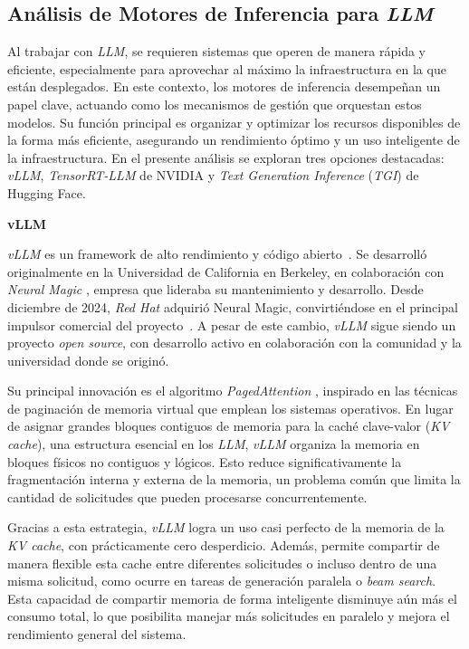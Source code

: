 \subsection{Análisis de Motores de Inferencia para \textit{LLM}}
Al trabajar con \textit{LLM}, se requieren sistemas que operen de manera rápida y eficiente, especialmente para aprovechar al máximo la infraestructura en la que están desplegados. En este contexto, los motores de inferencia desempeñan un papel clave, actuando como los mecanismos de gestión que orquestan estos modelos. Su función principal es organizar y optimizar los recursos disponibles de la forma más eficiente, asegurando un rendimiento óptimo y un uso inteligente de la infraestructura. En el presente análisis se exploran tres opciones destacadas: \textit{vLLM}, \textit{TensorRT-LLM} de NVIDIA y \textit{Text Generation Inference} (\textit{TGI}) de Hugging Face.

\vspace{0.5cm}
\noindent \textbf{vLLM}

\textit{vLLM} es un framework de alto rendimiento y código abierto~\cite{ref11}. Se desarrolló originalmente en la Universidad de California en Berkeley, en colaboración con \textit{Neural Magic} \cite{ref69}, empresa que lideraba su mantenimiento y desarrollo. Desde diciembre de 2024, \textit{Red Hat} adquirió Neural Magic, convirtiéndose en el principal impulsor comercial del proyecto~\cite{ref12}. A pesar de este cambio, \textit{vLLM} sigue siendo un proyecto \textit{open source}, con desarrollo activo en colaboración con la comunidad y la universidad donde se originó.

Su principal innovación es el algoritmo \textit{PagedAttention} \cite{ref39}, inspirado en las técnicas de paginación de memoria virtual que emplean los sistemas operativos. En lugar de asignar grandes bloques contiguos de memoria para la caché clave-valor (\textit{KV cache}), una estructura esencial en los \textit{LLM}, \textit{vLLM} organiza la memoria en bloques físicos no contiguos y lógicos. Esto reduce significativamente la fragmentación interna y externa de la memoria, un problema común que limita la cantidad de solicitudes que pueden procesarse concurrentemente.

Gracias a esta estrategia, \textit{vLLM} logra un uso casi perfecto de la memoria de la \textit{KV cache}, con prácticamente cero desperdicio. Además, permite compartir de manera flexible esta cache entre diferentes solicitudes o incluso dentro de una misma solicitud, como ocurre en tareas de generación paralela o \textit{beam search}. Esta capacidad de compartir memoria de forma inteligente disminuye aún más el consumo total, lo que posibilita manejar más solicitudes en paralelo y mejora el rendimiento general del sistema.


